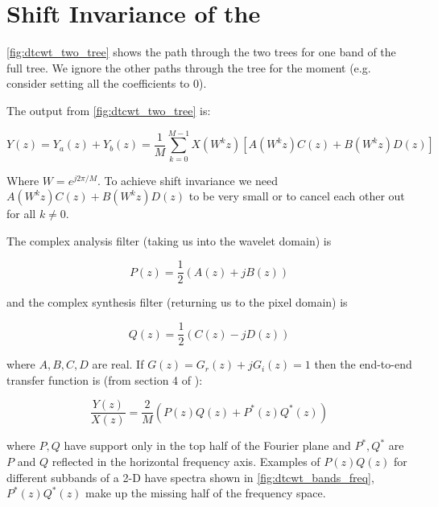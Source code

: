 \section{Shift Invariance of the \DTCWT}

\begin{figure}
  \centering
  
  \label{fig:dtcwt_two_tree}
\end{figure}

\autoref{fig:dtcwt_two_tree} shows the path through the two trees for one band
of the full tree. We ignore the other paths through the tree for the moment 
(e.g. consider setting all the coefficients to 0). 

The output from \autoref{fig:dtcwt_two_tree} is:

$$ Y(z) = Y_a(z) + Y_b(z) = \frac{1}{M}\sum_{k=0}^{M-1} X\left(W^k z\right)
  \left[ A\left(W^kz\right)C(z) + B\left(W^kz\right)D(z) \right] $$

Where $W=e^{j2\pi/M}$.  To achieve shift invariance we need 
$A\left(W^kz\right)C(z) + B\left(W^kz\right)D(z)$ to be very small or to cancel
each other out for all $k \neq 0$.

The complex analysis filter (taking us into the wavelet domain) is 

$$P(z) = \frac{1}{2}\left(A(z)+jB(z)\right)$$

and the complex synthesis filter (returning us to the pixel domain) is 

$$Q(z) = \frac{1}{2}\left(C(z) - jD(z)\right)$$

where $A,B,C,D$ are real.  If $G(z) = G_r(z) + jG_i(z) = 1$ then the end-to-end
transfer function is (from section 4 of \cite{kingsbury_complex_2001}):

\begin{equation}\label{eq:end_to_end1}
\frac{Y(z)}{X(z)} = \frac{2}{M}\left(P(z)Q(z) + P^*(z)Q^*(z)\right)
\end{equation}

where $P, Q$ have support only in the top half of the Fourier plane and $P^*,
Q^*$ are $P$ and $Q$ reflected in the horizontal frequency axis. Examples of
$P(z)Q(z)$ for different subbands of a 2-D \DTCWT have spectra shown in
\autoref{fig:dtcwt_bands_freq}, $P^*(z)Q^*(z)$ make up the missing half of the
frequency space.\\

